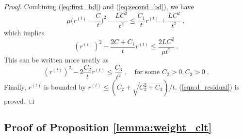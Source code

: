 \documentclass[final]{siamart1116}
\begin{document}
\begin{proof}
Combining (\ref{eq:first_bd}) and (\ref{eq:second_bd}), we have
\[
\mu\Big(r^{(t)} - \frac{C }{t}\Big)^2 - \frac{LC^2}{t^2} \leq \frac{C_1}{t}r^{(t)} + \frac{LC^2}{t^2} \;,
\]
which implies
\[
(r^{(t)})^2 - \frac{2C+C_1}{t}r^{(t)}\leq \frac{2LC^2}{\mu t^2} \;.
\]
This can be written more neatly as
\[(r^{(t)})^2 - 2\frac{C_2}{t}r^{(t)} \leq \frac{C_3}{t^2} \;, \quad \text{for some $C_2>0,C_3>0$} \;.
\]
Finally, $r^{(t)}$ is bounded by $r^{(t)}\leq (C_2+\sqrt{C_2^2+C_3})/t$. (\ref{eqn:d_residual}) is proved.
\end{proof}



\subsection{Proof of Proposition \ref{lemma:weight_clt}}
\label{app:weight_clt}
\end{document}

